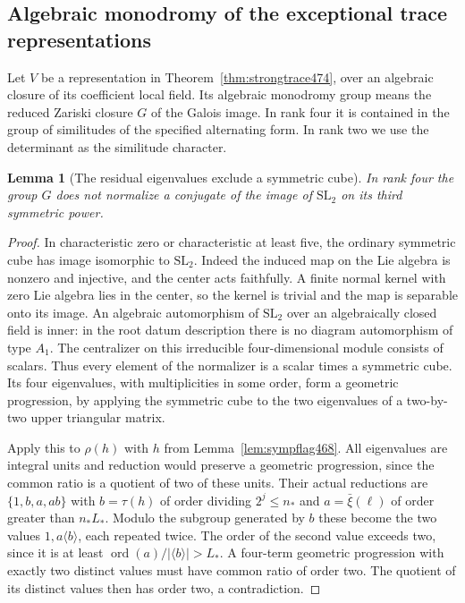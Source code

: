 \documentclass[a4paper,11pt]{article}
\newtheorem{lemma}[proposition]{Lemma}
\theoremstyle{definition}
\theoremstyle{remark}
\numberwithin{equation}{section}
\begin{document}
\subsection{Algebraic monodromy of the exceptional trace representations}
\label{sec:monodromy476}

Let \(V\) be a representation in Theorem~\ref{thm:strongtrace474},
over an algebraic closure of its coefficient local field. Its
algebraic monodromy group means the reduced Zariski closure \(G\)
of the Galois image. In rank four it is contained in the group of
similitudes of the specified alternating form. In rank two we
use the determinant as the similitude character.

\begin{lemma}[The residual eigenvalues exclude a symmetric cube]\leavevmode
\label{lem:fourweights476}
In rank four the group \(G\) does not normalize a conjugate of
the image of \(\mathrm{SL}_2\) on its third symmetric power.
\end{lemma}
\begin{proof}
In characteristic zero or characteristic at least five, the
ordinary symmetric cube has image isomorphic to \(\mathrm{SL}_2\).
Indeed the induced map on the Lie algebra is nonzero and injective,
and the center acts faithfully. A finite normal kernel with zero
Lie algebra lies in the center, so the kernel is trivial and the
map is separable onto its image. An algebraic automorphism of
\(\mathrm{SL}_2\) over an algebraically closed field is inner:
in the root datum description there is no diagram automorphism
of type \(A_1\). The centralizer on this irreducible four-dimensional
module consists of scalars. Thus every element of the normalizer
is a scalar times a symmetric cube. Its four eigenvalues, with
multiplicities in some order, form a geometric progression,
by applying the symmetric cube to the two eigenvalues of a
two-by-two upper triangular matrix.

Apply this to \(\rho(h)\) with \(h\) from Lemma~\ref{lem:sympflag468}.
All eigenvalues are integral units and reduction would preserve
a geometric progression, since the common ratio is a quotient
of two of these units. Their actual reductions are
\(\{1,b,a,ab\}\) with \(b=\tau(h)\) of order dividing \(2^j\le n_*\)
and \(a=\bar\xi(\ell)\) of order greater than \(n_*L_*\).
Modulo the subgroup generated by \(b\) these become the two
values \(1,a\langle b\rangle\), each repeated twice. The order
of the second value exceeds two, since it is at least
\(\operatorname{ord}(a)/|\langle b\rangle|>L_*\).
A four-term geometric progression with exactly two distinct
values must have common ratio of order two. The quotient of
its distinct values then has order two, a contradiction.
\end{proof}
\end{document}
